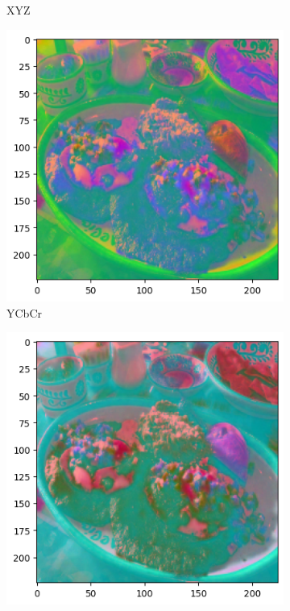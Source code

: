 \begin{figure}[htbp]
\begin{subfigure}[b]{0.22\textwidth}
    \caption{XYZ}
    \label{fig:xyz}
  \end{subfigure}
  \hfill
  \begin{subfigure}[b]{0.22\textwidth}
    \includegraphics[width=\textwidth]{graphics/images/colorspaces/ycbcr.png}
    \caption{YCbCr}
    \label{fig:ycbcr}
  \end{subfigure}
  \hfill
  \begin{subfigure}[b]{0.22\textwidth}
    \includegraphics[width=\textwidth]{graphics/images/colorspaces/ydbdr.png}

\end{subfigure}
\end{figure}
